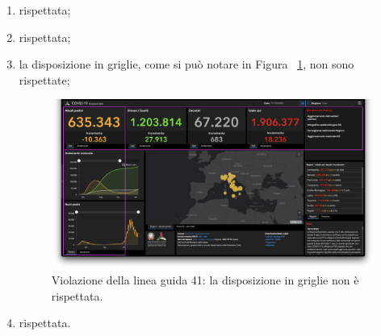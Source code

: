 \begin{enumerate}
\begin{figure}[H]
        \end{figure}
    \item rispettata;
    \item rispettata;
    \item la disposizione in griglie, come si può notare in  Figura ~\ref{fig:guidelines-violations-15}, non sono rispettate;
        \begin{figure}[H]
            \centering
            \includegraphics[width=0.5\columnwidth]{../../../assets/images/verifica-risorse-esistenti/guidelines_violations_17}
            \caption{Violazione della linea guida 41: la disposizione in griglie non è rispettata.}
            \label{fig:guidelines-violations-15}
        \end{figure}
    \item rispettata.
\end{enumerate}
